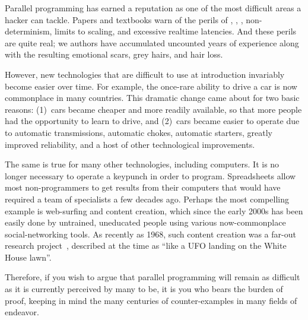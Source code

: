 
%

Parallel programming has earned a reputation as one of the most
difficult areas a hacker can tackle.
Papers and textbooks warn of the perils of , ,
, non-determinism,
 limits to scaling,
and excessive realtime latencies.
And these perils are quite real; we authors have accumulated uncounted
years of experience along with the resulting emotional scars,
grey hairs, and hair loss.

However, new technologies that are difficult to use at introduction
invariably become easier over time.
For example, the once-rare ability to drive a car is now
commonplace in many countries.
This dramatic change came about for two basic reasons: (1)~cars became
cheaper and more readily available, so that more people had the
opportunity to learn to drive, and (2)~cars became easier to operate
due to automatic transmissions, automatic chokes, automatic starters,
greatly improved reliability,
and a host of other technological improvements.

The same is true for many other technologies, including computers.
It is no longer necessary to operate a keypunch in order to program.
Spreadsheets allow most non-programmers to get results from their computers
that would have required a team of specialists a few decades ago.
Perhaps the most compelling example is web-surfing and content creation,
which since the early 2000s has been easily done by
untrained, uneducated people using various now-commonplace
social-networking tools.
As recently as 1968, such content creation was a far-out research
project~\cite{DouglasEngelbart1968}, described at
the time as
``like a UFO landing on the White House lawn''\cite{ScottGriffen2000}.

Therefore, if you wish to argue that parallel programming will remain
as difficult as it is currently perceived by many to be, it is you
who bears the burden of proof, keeping in mind the many centuries of
counter-examples in many fields of endeavor.


